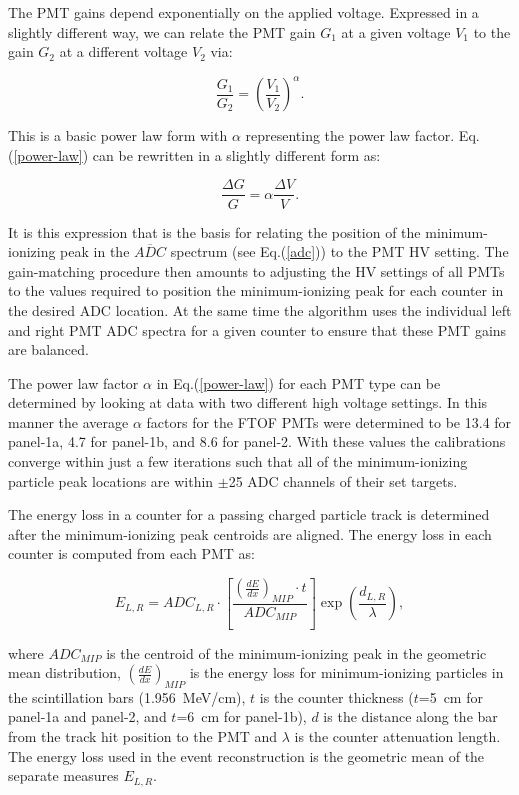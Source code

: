 \documentclass{elsart}
\begin{document}
The PMT gains depend exponentially on the applied voltage. Expressed in a slightly different way, we 
can relate the PMT gain $G_1$ at a given voltage $V_1$ to the gain $G_2$ at a different voltage $V_2$ 
via:

\begin{equation}
\label{power-law}
\frac{G_1}{G_2} = \left( \frac{V_1}{V_2} \right) ^\alpha.
\end{equation}

\noindent
This is a basic power law form with $\alpha$ representing the power law factor. Eq.(\ref{power-law}) can
be rewritten in a slightly different form as:

\begin{equation}
\label{delta}
\frac{\Delta G}{G} = \alpha \frac{\Delta V}{V}.
\end{equation}

It is this expression that is the basis for relating the position of the minimum-ionizing peak in the 
$\overline{ADC}$ spectrum (see Eq.(\ref{adc})) to the PMT HV setting. The gain-matching procedure
then amounts to adjusting the HV settings of all PMTs to the values required to position the
minimum-ionizing peak for each counter in the desired ADC location. At the same time the algorithm
uses the individual left and right PMT ADC spectra for a given counter to ensure that these PMT
gains are balanced.

The power law factor $\alpha$ in Eq.(\ref{power-law}) for each PMT type can be determined by looking
at data with two different high voltage settings. In this manner the average $\alpha$ factors for the
FTOF PMTs were determined to be 13.4 for panel-1a, 4.7 for panel-1b, and 8.6 for panel-2. With these
values the calibrations converge within just a few iterations such that all of the minimum-ionizing particle
peak locations are within $\pm$25 ADC channels of their set targets.

The energy loss in a counter for a passing charged particle track is determined after the
minimum-ionizing peak centroids are aligned. The energy loss in each counter is computed from each
PMT as:

\begin{equation}
E_{L,R} = ADC_{L,R} \cdot \left [ \frac{\left( \frac{dE}{dx} \right)_{MIP} \cdot t}{ADC_{MIP}}\right ]
\exp\left(\frac{d_{L,R}}{\lambda}\right),
\end{equation}

\noindent
where $ADC_{MIP}$ is the centroid of the minimum-ionizing peak in the geometric mean distribution,
$\left( \frac{dE}{dx} \right)_{MIP}$ is the energy loss for minimum-ionizing particles in the scintillation
bars (1.956~MeV/cm), $t$ is the counter thickness ($t$=5~cm for panel-1a and panel-2, and $t$=6~cm
for panel-1b), $d$ is the distance along the bar from the track hit position to the PMT and $\lambda$ is
the counter attenuation length. The energy loss used in the event reconstruction is the geometric mean of
the separate measures $E_{L,R}$.
\end{document}
